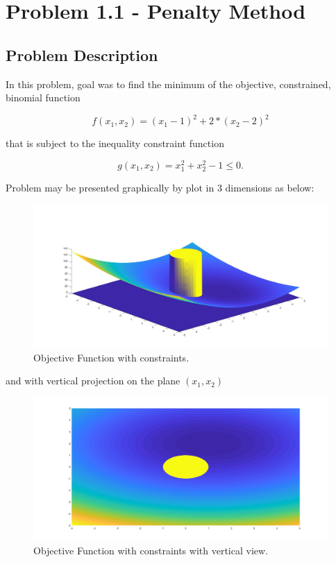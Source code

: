 \documentclass[main.tex]{subfiles}
\begin{document}
\chapter{Problem 1.1 - Penalty Method}

\section{Problem Description}

In this problem, goal was to ﬁnd the minimum of the objective, constrained, binomial function 

\begin{equation}
f(x_1,x_2) = (x_1 - 1)^2 + 2*(x_2 - 2)^2
\end{equation}

that is subject to the inequality constraint function

\begin{equation}
g(x_1,x_2) = x_1^2 + x_2^2 - 1 \leq 0.
\end{equation}

Problem may be presented graphically by plot in 3 dimensions as below:

\begin{figure}[h]
\label{fig:solution}
\centering
\includegraphics[width=\textwidth]{PenaltyMethod/PenaltyMethod_constrained_fx.jpg}
\caption{Objective Function with constraints.}
\end{figure}

and with vertical projection on the plane $(x_1, x_2)$

\begin{figure}[h]
\label{fig:solution}
\centering
\includegraphics[width=\textwidth]{PenaltyMethod/PenaltyMethod_constrained_fx_view(0,90)_.jpg}
\caption{Objective Function with constraints with vertical view.}
\end{figure}
\end{document}
